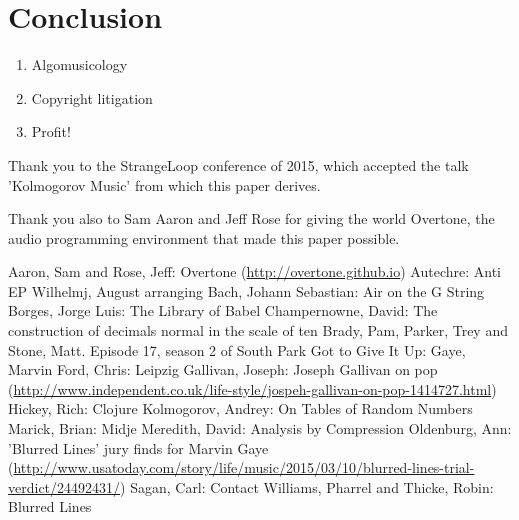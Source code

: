 \documentclass[numbers, preprint]{sigplanconf}
\begin{document}
\section{Conclusion}

\begin{enumerate}
    \item Algomusicology
    \item Copyright litigation
    \item Profit!
\end{enumerate}

\acks

Thank you to the StrangeLoop conference of 2015, which accepted the talk 'Kolmogorov Music' from which this paper derives.

Thank you also to Sam Aaron and Jeff Rose for giving the world Overtone\cite{Overtone}, the audio programming environment
that made this paper possible.




\begin{thebibliography}{}
\softraggedright

 Aaron, Sam and Rose, Jeff: Overtone (\url{http://overtone.github.io})
 Autechre: Anti EP
 Wilhelmj, August arranging Bach, Johann Sebastian: Air on the G String
 Borges, Jorge Luis: The Library of Babel
 Champernowne, David: The construction of decimals normal in the scale of ten
 Brady, Pam, Parker, Trey and Stone, Matt. Episode 17, season 2 of South Park
 Got to Give It Up: Gaye, Marvin
 Ford, Chris: Leipzig
 Gallivan, Joseph: Joseph Gallivan on pop (\url{http://www.independent.co.uk/life-style/jospeh-gallivan-on-pop-1414727.html})
 Hickey, Rich: Clojure
  Kolmogorov, Andrey: On Tables of Random Numbers
 Marick, Brian: Midje
 Meredith, David: Analysis by Compression
 Oldenburg, Ann: 'Blurred Lines' jury finds for Marvin Gaye (\url{http://www.usatoday.com/story/life/music/2015/03/10/blurred-lines-trial-verdict/24492431/})
 Sagan, Carl: Contact
 Williams, Pharrel and Thicke, Robin: Blurred Lines

\end{thebibliography}
\end{document}
